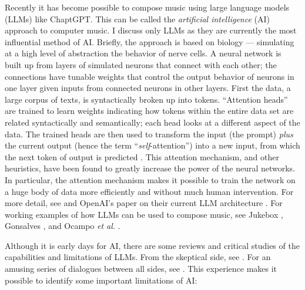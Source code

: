 \documentclass[]{interact}
\theoremstyle{plain}%
\theoremstyle{definition}
\theoremstyle{remark}
\begin{document}
Recently it has become possible to compose music using large language models (LLMs) like ChaptGPT. This can be called the \emph{artificial intelligence} (AI) approach to computer music. I discuss only LLMs as they are currently the most influential method of AI. Briefly, the approach is based on biology --- simulating at a high level of abstraction the behavior of nerve cells. A neural network is built up from layers of simulated neurons that connect with each other; the connections have tunable weights that control the output behavior of neurons in one layer given inputs from connected neurons in other layers. First the data, a large corpus of texts, is syntactically broken up into tokens. ``Attention heads'' are trained to learn weights indicating how tokens within the entire data set are related syntactically and semantically; each head looks at a different aspect of the data. The trained heads are then used to transform the input (the prompt) \emph{plus} the current output (hence the term ``\emph{self}-attention'') into a new input, from which the next token of output is predicted \citep{vaswani2017attention}. This attention mechanism, and other heuristics, have been found to greatly increase the power of the neural networks. In particular, the attention mechanism makes it possible to train the network on a huge body of data more efficiently and without much human intervention. For more detail, see \citep{zhang2023complete} and OpenAI's paper on their current LLM architecture \citep{openai2023gpt4}. For working examples of how LLMs can be used to compose music, see Jukebox \citep{openai2023jukebox}, Gonsalves \citep{aitunes}, and Ocampo \emph{et al.} \citep{ocampo2023using}.

Although it is early days for AI, there are some reviews and critical studies of the capabilities and limitations of LLMs. From the skeptical side, see \citep{dale2021gpt}. For an amusing series of dialogues between all sides, see \citep{aaronson2023should}. This experience makes it possible to identify some important limitations of AI:
\end{document}
